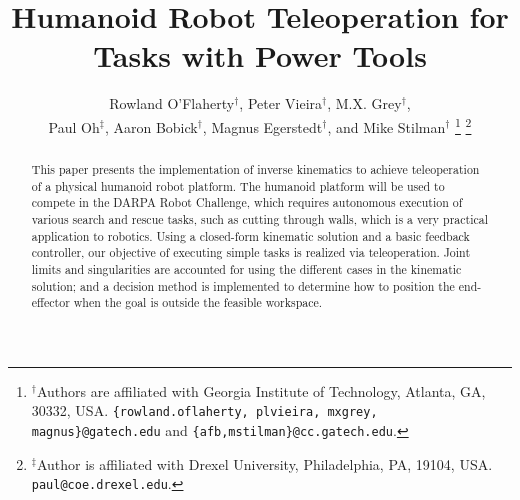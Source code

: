 \documentclass[letterpaper, 10 pt, conference]{IEEEtran}
\begin{document}

\pagestyle{empty}
\thispagestyle{fancyplain}


\title{\LARGE \bf
Humanoid Robot Teleoperation for Tasks with Power Tools
}

\author{Rowland O'Flaherty$^{\dagger}$, Peter Vieira$^{\dagger}$, M.X. Grey$^{\dagger}$, \\ Paul Oh$^{\ddagger}$, Aaron Bobick$^{\dagger}$, Magnus Egerstedt$^{\dagger}$, and Mike Stilman$^{\dagger}$%
\thanks{$^\dagger$Authors are affiliated with Georgia Institute of Technology, Atlanta, GA, 30332, USA. {\tt\small \{rowland.oflaherty, plvieira, mxgrey, magnus\}@gatech.edu} and {\tt\small \{afb,mstilman\}@cc.gatech.edu}.}%
\thanks{$^\ddagger$Author is affiliated with Drexel University, Philadelphia, PA, 19104, USA. {\tt\small paul@coe.drexel.edu}.}%
}

\maketitle
\pagestyle{plain}
\thispagestyle{fancyplain}

\begin{abstract}
This paper presents the implementation of inverse kinematics to achieve teleoperation of a physical humanoid robot platform. The humanoid platform will be used to compete in the DARPA Robot Challenge, which requires autonomous execution of various search and rescue tasks, such as cutting through walls, which is a very practical application to robotics. Using a closed-form kinematic solution and a basic feedback controller, our objective of executing simple tasks is realized via teleoperation. Joint limits and singularities are accounted for using the different cases in the kinematic solution; and a decision method is implemented to determine how to position the end-effector when the goal is outside the feasible workspace. 
\end{abstract}

\end{document}
